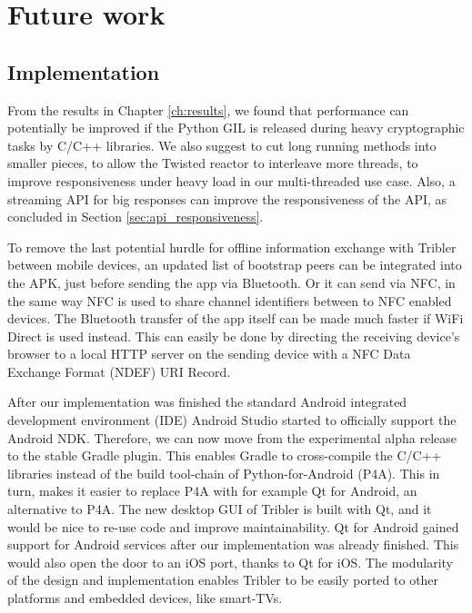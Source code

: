 \section{Future work}\label{sec:future_work}

\subsection{Implementation}
From the results in Chapter \ref{ch:results}, we found that performance can potentially be improved if the Python GIL is released during heavy cryptographic tasks by C/C++ libraries.
We also suggest to cut long running methods into smaller pieces, to allow the Twisted reactor to interleave more threads, to improve responsiveness under heavy load in our multi-threaded use case.
Also, a streaming API for big responses can improve the responsiveness of the API, as concluded in Section \ref{sec:api_responsiveness}.

To remove the last potential hurdle for offline information exchange with Tribler between mobile devices, an updated list of bootstrap peers can be integrated into the APK, just before sending the app via Bluetooth.
Or it can send via NFC, in the same way NFC is used to share channel identifiers between to NFC enabled devices.
The Bluetooth transfer of the app itself can be made much faster if WiFi Direct is used instead.
This can easily be done by directing the receiving device's browser to a local HTTP server on the sending device with a NFC Data Exchange Format (NDEF) URI Record.


After our implementation was finished the standard Android integrated development environment (IDE) Android Studio started to officially support the Android NDK.
Therefore, we can now move from the experimental alpha release to the stable Gradle plugin.
This enables Gradle to cross-compile the C/C++ libraries instead of the build tool-chain of Python-for-Android (P4A).
This in turn, makes it easier to replace P4A with for example Qt for Android, an alternative to P4A.
The new desktop GUI of Tribler is built with Qt, and it would be nice to re-use code and improve maintainability.
Qt for Android gained support for Android services after our implementation was already finished.
This would also open the door to an iOS port, thanks to Qt for iOS.
The modularity of the design and implementation enables Tribler to be easily ported to other platforms and embedded devices, like smart-TVs.

